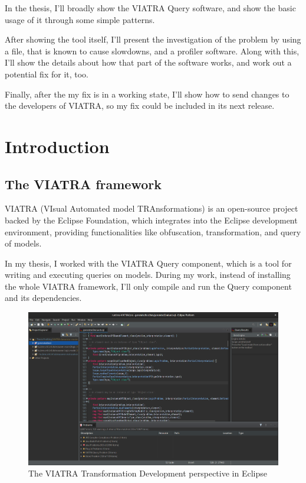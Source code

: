 \documentclass[11pt,a4paper,oneside]{report}
\begin{document}
In the thesis, I'll broadly show the VIATRA Query software, and show the
basic usage of it through some simple patterns.

After showing the tool itself, I'll present the investigation of the problem by
using a file, that is known to cause slowdowns, and a profiler software. Along
with this, I'll show the details about how that part of the software works, and
work out a potential fix for it, too.

Finally, after the my fix is in a working state, I'll show how to send changes
to the developers of VIATRA, so my fix could be included in its next release.
\vfill


\cleardoublepage
\selectthesislanguage
{}
\setcounter{romanPage}{\value{page}}


\chapter{Introduction}
\section{The VIATRA framework}
VIATRA (VIsual Automated model TRAnsformations) is an open-source project backed
by the Eclipse Foundation, which integrates into the Eclipse development
environment, providing functionalities like obfuscation, transformation, and
query of models.

In my thesis, I worked with the VIATRA Query component, which is a tool for
writing and executing queries on models. During my work, instead of installing
the whole VIATRA framework, I'll only compile and run the Query component and
its dependencies.

\begin{figure}[ht]
\centering
\includegraphics[width=150mm, keepaspectratio]{figures/eclipse-viatra.png}
\caption{The VIATRA Transformation Development perspective in Eclipse}
\label{fig:eclipse-viatra}
\end{figure}
\end{document}
